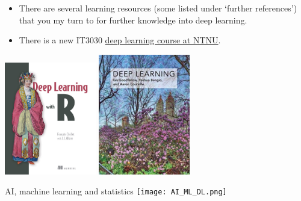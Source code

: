 \documentclass[
  10pt,
  ignorenonframetext,
]{beamer}
\providecommand{\tightlist}{%
  \setlength{\itemsep}{0pt}\setlength{\parskip}{0pt}}
\begin{document}
\begin{frame}
\begin{itemize}
\tightlist
\item
  There are several learning resources (some listed under `further
  references') that you my turn to for further knowledge into deep
  learning.
\item
  There is a new IT3030
  \href{https://www.ntnu.no/studier/emner/IT3030\#tab=omEmnet}{deep
  learning course at NTNU}.
\end{itemize}

\centering

\includegraphics[width=0.3\textwidth,height=\textheight]{DeepLearningwithR.jpeg}
\includegraphics[width=0.3\textwidth,height=\textheight]{DeepLearning.jpeg}
\end{frame}

\begin{frame}
\begin{block}{AI, machine learning and statistics}
\protect\hypertarget{ai-machine-learning-and-statistics}{}
\texttt{[image: AI\_ML\_DL.png]}
\end{block}
\end{frame}
\end{document}

